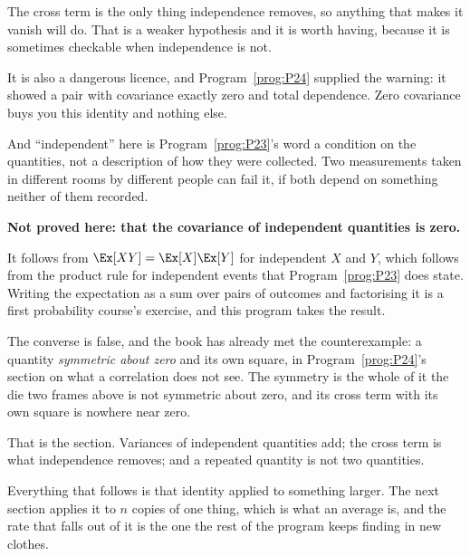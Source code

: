 \begin{fr}

The cross term is the only thing independence removes, so anything that makes
it vanish will do. That is a weaker hypothesis and it is worth having, because
it is sometimes checkable when independence is not.

It is also a dangerous licence, and Program~\ref{prog:P24} supplied the
warning: it showed a pair with covariance exactly zero and total dependence.
Zero covariance buys you this identity and nothing else.

And \enquote{independent} here is Program~\ref{prog:P23}'s word \dash{} a
condition on the quantities, not a description of how they were collected. Two
measurements taken in different rooms by different people can fail it, if both
depend on something neither of them recorded.
\end{fr}

\begin{fr}
\begin{rigourbox}
\textbf{Not proved here: that the covariance of independent quantities is
zero.}

It follows from $\Ex[XY] = \Ex[X]\Ex[Y]$ for independent $X$ and $Y$, which
follows from the product rule for independent events that
Program~\ref{prog:P23} does state. Writing the expectation as a sum over pairs
of outcomes and factorising it is a first probability course's exercise, and
this program takes the result.

The converse is false, and the book has already met the counterexample: a
quantity \emph{symmetric about zero} and its own square, in
Program~\ref{prog:P24}'s section on what a correlation does not see. The
symmetry is the whole of it \dash{} the die two frames above is not symmetric
about zero, and its cross term with its own square is nowhere near zero.
\end{rigourbox}
\end{fr}

\begin{fr}
That is the section. Variances of independent quantities add; the cross term
is what independence removes; and a repeated quantity is not two quantities.

Everything that follows is that identity applied to something larger. The next
section applies it to $n$ copies of one thing, which is what an average is,
and the rate that falls out of it is the one the rest of the program keeps
finding in new clothes.
\end{fr}

